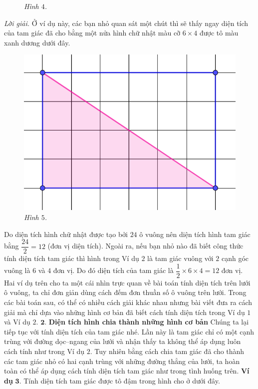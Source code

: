 \begin{multicols}{2}
\begin{figure}[H]
		\caption{\small\textit{\color{toancuabi}Hình $4$.}}
		\vspace*{-15pt}
	\end{figure}
	\textit{Lời giải.} Ở ví dụ này, các bạn nhỏ quan sát một chút thì sẽ thấy ngay diện tích của tam giác đã cho bằng một nửa hình chữ nhật màu cỡ $6\times 4$ được tô màu xanh dương dưới đây.
	\begin{figure}[H]
		\centering
		\vspace*{-5pt}
		\captionsetup{labelformat= empty, justification=centering}
		\includegraphics[width=0.5\linewidth]{5}
		\caption{\small\textit{\color{toancuabi}Hình $5$.}}
		\vspace*{-15pt}
	\end{figure}
	Do diện tích hình chữ nhật được tạo bởi $24$ ô vuông nên diện tích hình tam giác bằng $\dfrac{24}{2}=12$ (đơn vị diện tích).
	\vskip 0.1cm
	Ngoài ra, nếu bạn nhỏ nào đã biết công thức tính diện tích tam giác thì hình trong Ví dụ $2$ là tam giác vuông với $2$ cạnh góc vuông là $6$ và $4$ đơn vị. Do đó diện tích của tam giác là $\dfrac{1}{2}\times 6\times 4 = 12$ đơn vị.
	\vskip 0.1cm
	Hai ví dụ trên cho ta một cái nhìn trực quan về bài toán tính diện tích trên lưới ô vuông, ta chỉ đơn giản dùng cách đếm đơn thuần số ô vuông trên lưới. Trong các bài toán sau, có thể có nhiều cách giải khác nhau nhưng bài viết đưa ra cách giải mà chỉ dựa vào những hình cơ bản đã biết cách tính diện tích trong Ví dụ $1$ và Ví dụ $2$.
	\vskip 0.1cm
	$\pmb{2.}$ \textbf{\color{toancuabi}Diện tích hình chia thành những hình cơ bản}
	\vskip 0.1cm
	Chúng ta lại tiếp tục với tính diện tích của tam giác nhé. Lần này là tam giác chỉ có một cạnh trùng với đường dọc--ngang của lưới và nhận thấy ta không thể áp dụng luôn cách tính như trong Ví dụ $2$. Tuy nhiên bằng cách chia tam giác đã cho thành các tam giác nhỏ có hai cạnh trùng với những đường thẳng của lưới, ta hoàn toàn có thể áp dụng cách tính diện tích tam giác như trong tình huống trên.
	\vskip 0.1cm
	\textbf{\color{toancuabi}Ví dụ} $\pmb{3.}$ Tính diện tích tam giác được tô đậm trong hình cho ở dưới đây.

\end{multicols}
